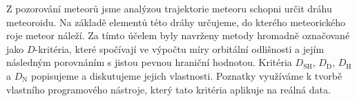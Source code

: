 Z pozorování meteorů jsme analýzou trajektorie meteoru schopni určit dráhu meteoroidu. Na základě elementů této dráhy určujeme, do kterého meteorického roje meteor náleží. Za tímto účelem byly navrženy metody hromadně označované jako $D$-kritéria, které spočívají ve výpočtu míry orbitální odlišnosti a jejím následným porovnáním s jistou pevnou hraniční hodnotou. Kritéria $D_\text{SH}$, $D_\text{D}$, $D_\text{H}$ a $D_\text{N}$ popisujeme a diskutujeme jejich vlastnosti. Poznatky využíváme k tvorbě vlastního programového nástroje, který tato kritéria aplikuje na reálná data.